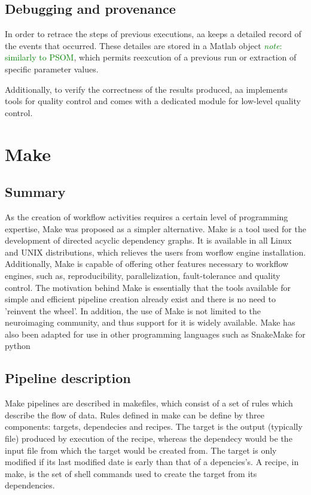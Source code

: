 \documentclass{report}
\newcommand{\note}[1]{\textcolor{green}{\textit{note}: #1}}
\begin{document}
        \subsection{Debugging and provenance}
        In order to retrace the steps of previous executions, aa keeps a
detailed record of the events that occurred. These detailes are stored in a
Matlab object \note{similarly to PSOM}, which permits reexcution of a previous
run or extraction of specific parameter values.

        Additionally, to verify the correctness of the results produced, aa
implements tools for quality control and comes with a dedicated module for
low-level quality control.
        
    \section{Make}
        \subsection{Summary}
        As the creation of workflow activities requires a certain level of
programming expertise, Make was proposed as a simpler alternative. Make is a
tool used for the development of directed acyclic dependency graphs. It is
available in all Linux and UNIX distributions, which relieves the users from
worflow engine installation. Additionally, Make is capable of offering other
features necessary to workflow engines, such as, reproducibility,
parallelization, fault-tolerance and quality control. The motivation behind Make
is essentially that the tools available for simple and efficient pipeline
creation already exist and there is no need to 'reinvent the wheel'. In
addition, the use of Make is not limited to the neuroimaging community, and thus
support for it is widely available. Make has also been adapted for use in other
programming languages such as SnakeMake for python

 
        \subsection{Pipeline description}
        Make pipelines are described in makefiles, which consist of a set of
rules which describe the flow of data. Rules defined in make can be define by three
components: targets, dependecies and recipes. The target is the output
(typically file) produced by execution of the recipe, whereas the dependecy
would be the input file from which the target would be created from. The target
is only modified if its last modified date is early than that of a depencies's.
A recipe, in make, is the set of shell commands used to create the target from
its dependencies. 
\end{document}
